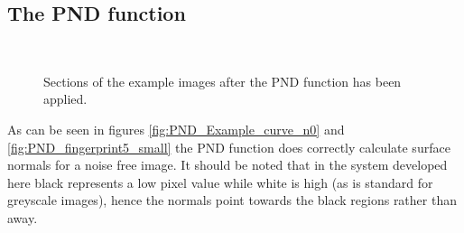 \documentclass[11pt,a4paper]{article}
\begin{document}
\begin{multicols}{2}
	\subsection{The PND function}
			\begin{figure}
				\centering
				 \;
				 \\
\;
				\caption{Sections of the example images after the PND function has been applied.}
				\label{fig:PND_img}
			\end{figure}

		As can be seen in figures \ref{fig:PND_Example_curve_n0} and \ref{fig:PND_fingerprint5_small} the PND function does correctly calculate surface normals for a noise free image. It should be noted that in the system developed here black represents a low pixel value while white is high (as is standard for greyscale images), hence the normals point towards the black regions rather than away.


\end{multicols}
\end{document}
